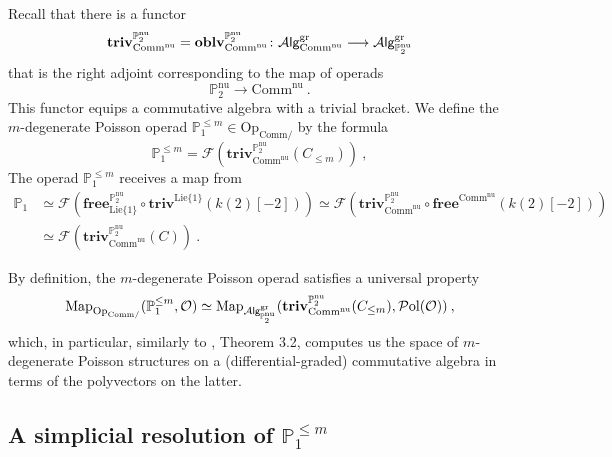 \documentclass[10pt, oneside]{amsart}
\theoremstyle{plain}
\newcommand{\Alg}{\mathcal{A}\text{\sf lg}}
\newcommand{\comm}{\mathrm{Comm}}
\newcommand{\F}{\mathcal{F}}
\newcommand{\Free}{\mathbf{free}}
\newcommand{\gr}{\mathrm{gr}}
\newcommand{\lie}{\mathrm{Lie}}
\newcommand{\map}{\mathrm{Map}}
\renewcommand{\nu}{\mathrm{nu}}
\renewcommand{\O}{\mathcal{O}}
\newcommand{\Oblv}{\mathbf{oblv}}
\newcommand{\op}{\mathrm{Op}}
\newcommand{\PP}{\mathbb{P}}
\newcommand{\Pol}{\mathcal{P}\mathrm{ol}}
\newcommand{\Triv}{\mathbf{triv}}
\begin{document}
\begin{definition}\label{main-def}
Recall that there is a functor
\begin{equation*}
\Triv^{\PP^\nu_2}_{\comm^\nu} = \Oblv^{\PP^\nu_2}_{\comm^\nu} \colon \Alg^\gr_{\comm^\nu} \longrightarrow \Alg^\gr_{\PP^\nu_2}
\end{equation*}
that is the right adjoint corresponding to the map of operads
\begin{equation*}
\PP^\nu_2 \longrightarrow \comm^\nu \:.
\end{equation*}
This functor equips a commutative algebra with a trivial bracket.
We define the $m$-degenerate Poisson operad $\PP_1^{\le m} \in \op_{\comm/}$ by the formula
\begin{equation*}
\PP_1^{\le m} = \F( \Triv^{\PP^\nu_2}_{\comm^\nu} (C_{\le m}) ) \:,
\end{equation*}
The operad $\PP_1^{\le m}$ receives a map from
\begin{equation*}
\begin{split}
\PP_1 &\simeq \F(\Free^{\PP^\nu_2}_{\lie\{1\}} \circ \Triv^{\lie\{1\}} (k(2)[-2]) ) \simeq \F( \Triv^{\PP_2^\nu}_{\comm^\nu} \circ \Free^{\comm^\nu} (k(2)[-2]) ) \\
&\simeq \F( \Triv^{\PP^\nu_2}_{\comm^\nu}(C)) \:.
\end{split}
\end{equation*}
\end{definition}

\begin{remark}
By definition, the $m$-degenerate Poisson operad satisfies a universal property
\begin{equation*}
\map_{\op_{\comm/}} (\PP_1^{\le m}, \O) \simeq \map_{\Alg^\gr_{\PP^\nu_2}} ( \Triv^{\PP^\nu_2}_{\comm^\nu} (C_{\le m}) , \Pol(\O)) \:,
\end{equation*}
which, in particular, similarly to \cite{Melani}, Theorem 3.2, computes us the space of $m$-degenerate Poisson structures on a 
(differential-graded) commutative algebra in terms of the polyvectors on the latter.
\end{remark}

\subsection{A simplicial resolution of $\PP^{\le m}_1$}
\end{document}
